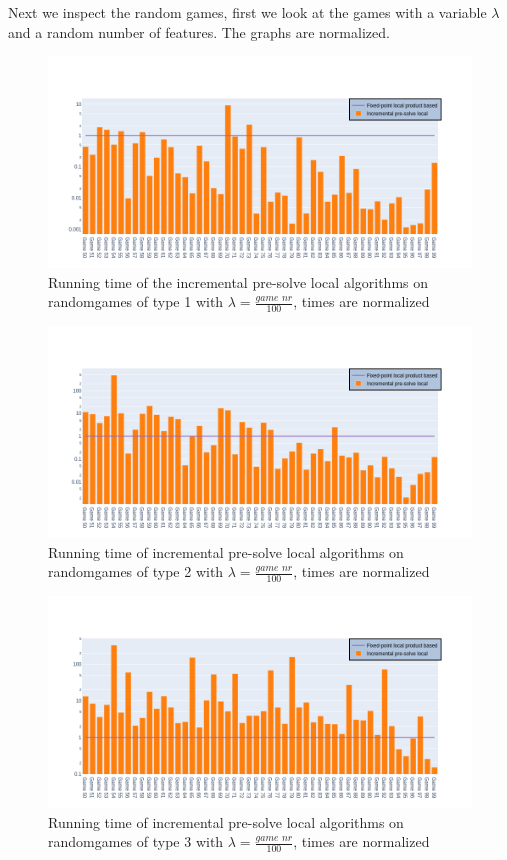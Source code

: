 Next we inspect the random games, first we look at the games with a variable $\lambda$ and a random number of features. The graphs are normalized.
\begin{figure}[H]
	\includegraphics[width=1\linewidth]{"results/FF_randomgames/Fixed-point local product based_Incremental pre-solve local_"}
	\caption{Running time of the incremental pre-solve local algorithms on randomgames of type 1 with $\lambda = \frac{\textit{game nr}}{100}$, times are normalized}
	\label{fig:elevatorzlnks}
\end{figure}%
\begin{figure}[H]
	\includegraphics[width=1\linewidth]{"results/FC_randomgames/Fixed-point local product based_Incremental pre-solve local_"}
	\caption{Running time of incremental pre-solve local algorithms on randomgames of type 2 with $\lambda = \frac{\textit{game nr}}{100}$, times are normalized}
	\label{fig:elevatorzlnks}
\end{figure}%
\begin{figure}[H]
	\includegraphics[width=1\linewidth]{"results/BC_randomgames/Fixed-point local product based_Incremental pre-solve local_"}
	\caption{Running time of incremental pre-solve local algorithms on randomgames of type 3 with $\lambda = \frac{\textit{game nr}}{100}$, times are normalized}
	\label{fig:elevatorzlnks}
\end{figure}%
